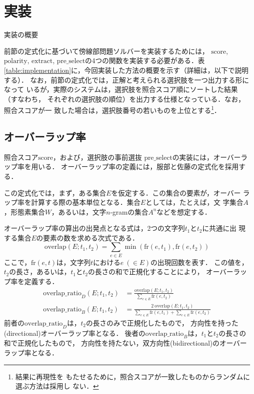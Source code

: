 \documentclass[japanese]{jnlp_1.4}
\begin{document}
\section{実装}

\begin{table}[b]
\vspace{-0.3\Cvs}
\caption{実装の概要}
\label{table:implementation}

\vspace{-0.3\Cvs}
\end{table}

前節の定式化に基づいて傍線部問題ソルバーを実装するためには，
$\mathrm{score}$, $\mathrm{polarity}$, $\mathrm{extract}$,
$\mathrm{pre\_select}$の4つの関数を実装する必要がある．表
\ref{table:implementation}に，今回実装した方法の概要を示す（詳細は，以下で説明する）．
なお，前節の定式化では，正解と考えられる選択肢を一つ出力する形になって
いるが，実際のシステムは，選択肢を照合スコア順にソートした結果（すなわち，
それぞれの選択肢の順位）を出力する仕様となっている．なお，照合スコアが一
致した場合は，選択肢番号の若いものを上位とする\footnote{結果に再現性を
もたせるために，照合スコアが一致したものからランダムに選ぶ方法は採用し
ない．}．



\subsection{オーバーラップ率}

照合スコア$\mathrm{score}$，および，選択肢の事前選抜
$\mathrm{pre\_select}$の実装には，オーバーラップ率を用いる．
オーバーラップ率の定義には，服部と佐藤の定式化\cite{Hattori2013,SKL2013}を採用する．

この定式化では，まず，ある集合$E$を仮定する．この集合の要素が，オーバー
ラップ率を計算する際の基本単位となる．集合$E$としては，たとえば，文
字集合$A$，形態素集合$W$，あるいは，文字$n$-gramの集合$A^n$などを想定する．

オーバーラップ率の算出の出発点となる式は，2つの文字列$t_1$と$t_2$に共通に出
現する集合$E$の要素の数を求める次式である．
\begin{equation}
\mathrm{overlap}({E}; t_1, t_2) =
\sum_{e\in E} \min(\mathrm{fr}(e, t_1), 
\mathrm{fr}(e, t_2))
\end{equation}
ここで，$\mathrm{fr}(e, t)$は，文字列$t$における$e\: (\in E)$の出現回数を表す．
この値を，$t_2$の長さ，あるいは，$t_1$と$t_2$の長さの和で正規化することにより，
オーバーラップ率を定義する．
\begin{align}
\mathrm{overlap\_ratio}_D(E; t_1, t_2) & = 
\frac{\mathrm{overlap}(E; t_1, t_2)}{
\displaystyle\sum_{e\in E} \mathrm{fr}(e, t_2)} \label{eq:directional}\\
\mathrm{overlap\_ratio}_B(E; t_1, t_2) & = 
\frac{2 \ \mathrm{overlap}(E; t_1, t_2)}{
\displaystyle\sum_{e\in E} \mathrm{fr}(e, t_1) +
\sum_{e\in E} \mathrm{fr}(e, t_2)}
\end{align}
前者の$\mathrm{overlap\_ratio}_D$は，$t_2$の長さのみで正規化したもので，
方向性を持った(directional)オーバーラップ率となる．
後者の$\mathrm{overlap\_ratio}_B$は，$t_1$と$t_2$の長さの和で正規化したもので，
方向性を持たない，双方向性(bidirectional)のオーバーラップ率となる．
\end{document}
